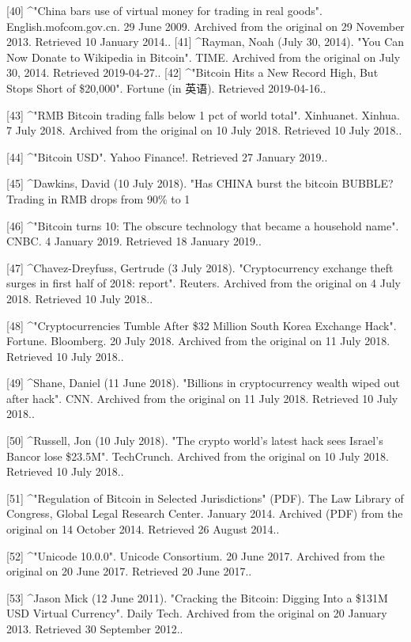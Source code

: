[40]
^"China bars use of virtual money for trading in real goods". English.mofcom.gov.cn. 29 June 2009. Archived from the original on 29 November 2013. Retrieved 10 January 2014..
[41]
^Rayman, Noah (July 30, 2014). "You Can Now Donate to Wikipedia in Bitcoin". TIME. Archived from the original on July 30, 2014. Retrieved 2019-04-27..
[42]
^"Bitcoin Hits a New Record High, But Stops Short of \$20,000". Fortune (in 英语). Retrieved 2019-04-16..

[43]
^"RMB Bitcoin trading falls below 1 pct of world total". Xinhuanet. Xinhua. 7 July 2018. Archived from the original on 10 July 2018. Retrieved 10 July 2018..

[44]
^"Bitcoin USD". Yahoo Finance!. Retrieved 27 January 2019..

[45]
^Dawkins, David (10 July 2018). "Has CHINA burst the bitcoin BUBBLE? Trading in RMB drops from 90\% to 1%

[46]
^"Bitcoin turns 10: The obscure technology that became a household name". CNBC. 4 January 2019. Retrieved 18 January 2019..

[47]
^Chavez-Dreyfuss, Gertrude (3 July 2018). "Cryptocurrency exchange theft surges in first half of 2018: report". Reuters. Archived from the original on 4 July 2018. Retrieved 10 July 2018..

[48]
^"Cryptocurrencies Tumble After \$32 Million South Korea Exchange Hack". Fortune. Bloomberg. 20 July 2018. Archived from the original on 11 July 2018. Retrieved 10 July 2018..

[49]
^Shane, Daniel (11 June 2018). "Billions in cryptocurrency wealth wiped out after hack". CNN. Archived from the original on 11 July 2018. Retrieved 10 July 2018..

[50]
^Russell, Jon (10 July 2018). "The crypto world's latest hack sees Israel's Bancor lose \$23.5M". TechCrunch. Archived from the original on 10 July 2018. Retrieved 10 July 2018..

[51]
^"Regulation of Bitcoin in Selected Jurisdictions" (PDF). The Law Library of Congress, Global Legal Research Center. January 2014. Archived (PDF) from the original on 14 October 2014. Retrieved 26 August 2014..

[52]
^"Unicode 10.0.0". Unicode Consortium. 20 June 2017. Archived from the original on 20 June 2017. Retrieved 20 June 2017..

[53]
^Jason Mick (12 June 2011). "Cracking the Bitcoin: Digging Into a \$131M USD Virtual Currency". Daily Tech. Archived from the original on 20 January 2013. Retrieved 30 September 2012..

